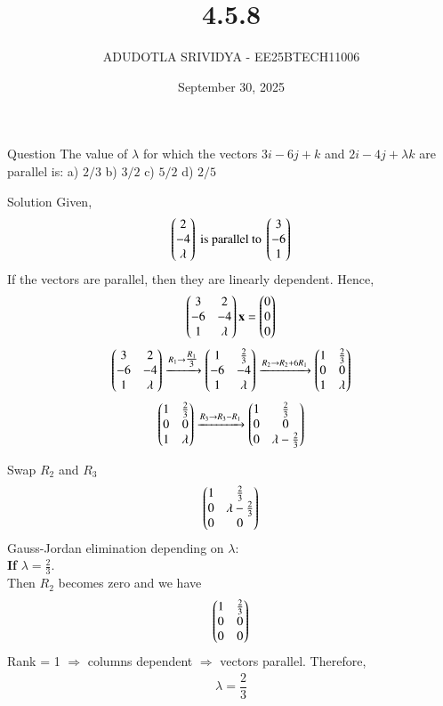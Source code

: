 \documentclass{beamer}
\title{4.5.8}
\date{September 30, 2025}
\author{ADUDOTLA SRIVIDYA - EE25BTECH11006}
\begin{document}
\frame{\titlepage}

\begin{frame}{Question}
The value of $\lambda$ for which the vectors $3i-6j+k$ and $2i-4j+\lambda k$ are parallel is:  
a) $2/3$ \quad b) $3/2$ \quad c) $5/2$ \quad d) $2/5$
\end{frame}


\begin{frame}{Solution}
Given,
\begin{align}
    \begin{pmatrix}2\\-4\\ \lambda\end{pmatrix} \text{ is parallel to } \begin{pmatrix}3\\-6\\1\end{pmatrix}
\end{align}
If the vectors are parallel, then they are linearly dependent. Hence,
\begin{align}
    \begin{pmatrix}3 & 2 \\ -6 & -4 \\ 1 & \lambda\end{pmatrix}\mathbf{x} = \begin{pmatrix}0 \\ 0 \\ 0\end{pmatrix}
\end{align}
\begin{align}
\begin{pmatrix}3 & 2 \\ -6 & -4 \\ 1 & \lambda\end{pmatrix}
\xrightarrow{R_1 \rightarrow \tfrac{R_1}{3}}
\begin{pmatrix}1 & \tfrac{2}{3} \\ -6 & -4 \\ 1 & \lambda\end{pmatrix}
\xrightarrow{R_2 \rightarrow R_2 + 6R_1}
\begin{pmatrix}1 & \tfrac{2}{3} \\ 0 & 0 \\ 1 & \lambda\end{pmatrix}
\end{align}
\begin{align}
\begin{pmatrix}1 & \tfrac{2}{3} \\ 0 & 0 \\ 1 & \lambda\end{pmatrix}
\xrightarrow{R_3 \rightarrow R_3 - R_1}
\begin{pmatrix}1 & \tfrac{2}{3} \\ 0 & 0 \\ 0 & \lambda - \tfrac{2}{3}\end{pmatrix}
\end{align}
\end{frame}

\begin{frame}
Swap $R_2$ and $R_3$
\begin{align}
    \begin{pmatrix}1 & \tfrac{2}{3} \\ 0 & \lambda - \tfrac{2}{3} \\ 0 & 0\end{pmatrix}
\end{align}
   Gauss-Jordan elimination depending on \(\lambda\): \\
\textbf{If} \(\lambda = \tfrac{2}{3}.\) \\
Then $R_2$ becomes zero and we have
\begin{align}
    \begin{pmatrix}1 & \tfrac{2}{3} \\ 0 & 0 \\ 0 & 0\end{pmatrix}
\end{align}
 Rank = 1 \(\Rightarrow\) columns dependent \(\Rightarrow\) vectors parallel.
 Therefore,
 \begin{align}
     \lambda = \dfrac{2}{3}
 \end{align}
\end{frame}
\end{document}
